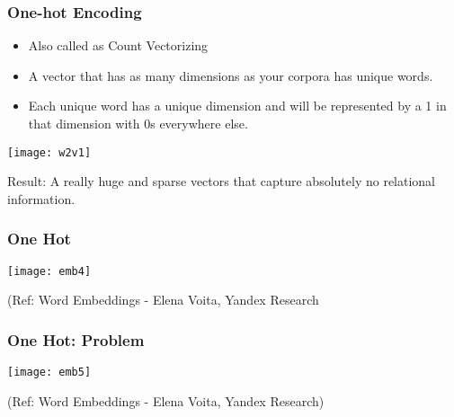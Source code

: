 


\begin{frame}[fragile]\frametitle{One-hot Encoding}
  \begin{itemize}
    \item Also called as Count Vectorizing
	\item A vector that has as many dimensions as your corpora has unique words. 
	\item Each unique word has a unique dimension and will be represented by a 1 in that dimension with 0s everywhere else.
  \end{itemize}
  
\begin{center}
\texttt{[image: w2v1]}
\end{center}

Result: A really huge and sparse vectors that capture absolutely no relational information.
\end{frame}


\begin{frame}[fragile]\frametitle{One Hot}
\begin{center}
\texttt{[image: emb4]}
\end{center}

{\tiny (Ref: Word Embeddings - Elena Voita, Yandex Research}
\end{frame}


\begin{frame}[fragile]\frametitle{One Hot: Problem}
\begin{center}
\texttt{[image: emb5]}
\end{center}

{\tiny (Ref: Word Embeddings - Elena Voita, Yandex Research)}
\end{frame}


